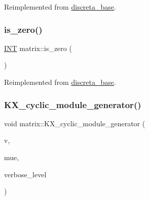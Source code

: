 Reimplemented from \mbox{\hyperlink{classdiscreta__base_a28fa37aac83194174888d34f07f43848}{discreta\+\_\+base}}.

\mbox{\label{classmatrix_a1940fae0fd429e77918eaa3d68cecd12}} 
\subsubsection{\texorpdfstring{is\+\_\+zero()}{is\_zero()}}
{\footnotesize\ttfamily \mbox{\hyperlink{galois_8h_a09fddde158a3a20bd2dcadb609de11dc}{I\+NT}} matrix\+::is\+\_\+zero (\begin{DoxyParamCaption}{ }\end{DoxyParamCaption})\hspace{0.3cm}{\ttfamily [virtual]}}



Reimplemented from \mbox{\hyperlink{classdiscreta__base_ac75f6bdc1ba1b406e26cf921adfd9864}{discreta\+\_\+base}}.

\mbox{\label{classmatrix_ace9dbe1f348d6fa63d1005e8f601897b}} 
\subsubsection{\texorpdfstring{K\+X\+\_\+cyclic\+\_\+module\+\_\+generator()}{KX\_cyclic\_module\_generator()}}
{\footnotesize\ttfamily void matrix\+::\+K\+X\+\_\+cyclic\+\_\+module\+\_\+generator (\begin{DoxyParamCaption}\item[{\mbox{\hyperlink{class_vector}{Vector}} \&}]{v,  }\item[{\mbox{\hyperlink{classunipoly}{unipoly}} \&}]{mue,  }\item[{\mbox{\hyperlink{galois_8h_a09fddde158a3a20bd2dcadb609de11dc}{I\+NT}}}]{verbose\+\_\+level }\end{DoxyParamCaption})}

\mbox{\label{classmatrix_accef670f4dfd666f9de32fe50754665d}} 

